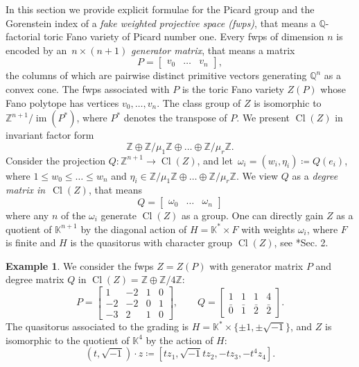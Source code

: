 \documentclass{amsart}
\DeclareMathOperator{\im}{im}
\DeclareMathOperator{\Cl}{Cl}
\newcommand{\Z}{\mathbb{Z}}
\newcommand{\Q}{\mathbb{Q}}
\newcommand{\K}{\mathbb{K}}
\theoremstyle{definition}
\newtheorem{example}[lem]{Example}
\begin{document}
In this section we provide explicit formulae for the Picard group and the Gorenstein index of a \emph{fake weighted projective space (fwps)}, that means a $\Q$-factorial toric Fano variety of Picard number one. Every fwps of dimension $n$ is encoded by an~$n\times(n+1)$ \emph{generator matrix}, that means a matrix
$$
P=\begin{bmatrix}
  v_0 & \dots & v_n  
\end{bmatrix},
$$
the columns of which are pairwise distinct primitive vectors generating $\Q^n$ as a convex cone. The fwps associated with $P$ is the toric Fano variety $Z(P)$ whose Fano polytope has vertices $v_0,\dots,v_n$. The class group of $Z$ is isomorphic to~$\Z^{n+1}/\im(P^*)$, where $P^*$ denotes the transpose of $P$. We present $\Cl(Z)$ in invariant factor form
$$\Z\oplus \Z/\mu_1\Z\oplus\dots\oplus\Z/\mu_r\Z.$$
Consider the projection $Q\colon \Z^{n+1}\rightarrow\Cl(Z)$, and let~$\omega_i=(w_i,\eta_i)\coloneqq Q(e_i)$, where $1\leq w_0\leq\dots\leq w_n$ and $\eta_i\in\Z/\mu_1\Z\oplus\dots\oplus\Z/\mu_r\Z$. We view $Q$ as a \emph{degree matrix in}~$\Cl(Z)$, that means
$$
Q=\begin{bmatrix}
    \omega_0 & \dots &\omega_n
\end{bmatrix}
$$
where any $n$ of the $\omega_i$ generate $\Cl(Z)$ as a group.
One can directly gain $Z$ as a quotient of $\K^{n+1}$ by the diagonal action of $H=\K^*\times F$ with weights $\omega_i$, where $F$ is finite and $H$ is the quasitorus with character group $\Cl(Z)$, see \cite{HHHS}*{Sec. 2}.

\begin{example}\label{ex:fwps}
    We consider the fwps $Z=Z(P)$ with generator matrix $P$ and degree matrix $Q$ in $\Cl(Z)=\Z\oplus \Z/4\Z$:
    $$
    P=\begin{bmatrix}
        1 & -2 & 1 & 0\\
        -2 & -2 & 0 & 1\\
        -3 & 2 & 1 & 0
    \end{bmatrix},\qquad 
    Q=\begin{bmatrix}
        1 & 1 & 1 & 4 \\
        \bar{0} & \bar{1} & \bar{2} & \bar{2}
    \end{bmatrix}.
    $$
    The quasitorus associated to the grading is $H=\K^*\times\{\pm 1, \pm \sqrt{-1}\}$, and $Z$ is isomorphic to the quotient of $\K^4$ by the action of $H$:
    $$
    (t,\sqrt{-1})\cdot z\coloneqq[tz_1,\sqrt{-1}tz_2,-tz_3,-t^4z_4].
    $$
\end{example}
\end{document}
